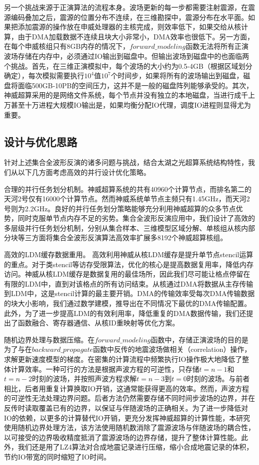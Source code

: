 另一个挑战来源于正演算法的流程本身。波场更新的每一步都需要注射震源，在震源编码叠加之后，震源的位置分布不连续，在三维勘探中，震源分布在水平面。如果把添加震源的操作放在申威处理器的主核完成，则效率低下，如果交给从核计算，由于DMA加载数据不连续且块大小非常小，DMA效率也很低下。另一方面，在每个申威核组只有8GB内存的情况下，$forward\_modeling$函数无法将所有正演波场存储在内存中，必须通过IO输出到磁盘中。但输出波场到磁盘中的也面临两个挑战。首先，在三维正演模拟中，每个波场的大小约为0.5-4GB（根据区域划分确定），每次模拟需要执行$10^4$值$10^7$个时间步，如果将所有的波场输出到磁盘，磁盘将面临500GB-10PB的空间压力，这并不是一般的磁盘阵列能够承受的。其次，神威超算采用的是网络文件系统，每个节点并没有独立的本地磁盘，当进行成千上万甚至十万进程大规模IO输出是，如果均衡分配IO代理，调度IO进程则显得尤为重要。


\subsection{设计与优化思路}

针对上述集合全波形反演的诸多问题与挑战，结合太湖之光超算系统结构特性，我们从以下几方面考虑高效的并行设计优化策略。

合理的并行任务划分机制。神威超算系统的共有40960个计算节点，而排名第二的天河2号仅有16000个计算节点\cite{tianhe-2}。然而神威系统单节点主频只有1.45GHz，而天河2号则为2.2GHz。良好的并行任务划分策略能够充分利用神威超算的众多节点优势，同时克服单节点内存不足的劣势。集合全波形反演应用中，我们设计了高效的多层级并行任务划分机制，分别从集合样本、三维模型区域分解、单核组从核内部分块等三方面将集合全波形反演算法高效率扩展多8192个神威超算核组。

高效的LDM缓存数据重用。 高效利用神威从核LDM缓存是提升单节点stencil运算的重点。对于类stencil等访存受限算法，优化的核心是提高数据复用率，降低内存访问。神威从核LDM缓存是数据复用的最佳场所，因此我们尽可能让格点停留在有限的LDM中，直到对该格点的所有访问结束。从核通过DMA将数据从主存传输到LDM中，这是stencil计算的最主要开销。DMA的传输效率受每次DMA传输数据的块大小影响，我们通过数学建模，推导出在不同情况下最优的DMA传输配置。此外，为了进一步提高LDM的有效利用率，降低重复的DMA数据传输，我们还提出了函数融合、寄存器通信、从核ID重映射等优化方案。

随机边界处理与数据压缩。在$forward\_modeling$函数中，存储正演波场的目的是为了与在$backward\_propagate$函数中反传的地震波场做相关（correlation）操作，求解更新速度模型的梯度。在密集的计算流程中频繁执行IO操作极大地降低了整体计算效率。一种可行的方法是根据声波方程的可逆性，只存储$t=n-1$和$t=n-2$时刻的波场，并按照声波方程求解$t=n-3$到$t=0$时刻的波场。与前者相比，后者用重复计算换取IO开销，这通常能获得更高的效率。然而，声波方程的可逆性无法处理边界问题。后者方法仍然需要存储不同时间步波场的边界，并在反传时读取覆盖已有的边界，以保证与伴随波场的正确相关。为了进一步降低对IO的依赖，以更多的计算替代IO开销，更充分发挥神威超算的计算性能，本研究使用随机边界处理方法，该方法使用随机数消除了震源波场与伴随波场的耦合性，以可接受的边界吸收精度抵消了震源波场的边界存储，提升了整体计算性能。此外，我们还是用了LZ4算法对合成地震记录进行压缩，缩小合成地震记录的体积，节约IO带宽的同时缩短了IO时间。






